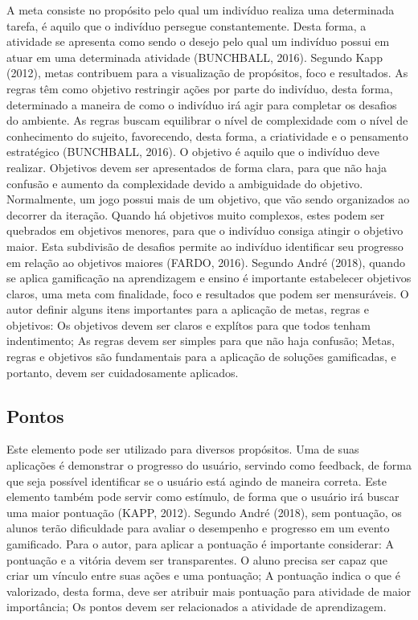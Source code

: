 \documentclass[
	12pt,				%
	oneside,			%
	a4paper,			%
	english,			%
	french,				%
	spanish,			%
	brazil,				%
	]{abntex2}
\begin{document}
A meta consiste no propósito pelo qual um indivíduo realiza uma determinada tarefa, é aquilo que o indivíduo persegue constantemente. Desta forma, a atividade se apresenta como sendo o desejo pelo qual um indivíduo possui em atuar em uma determinada atividade (BUNCHBALL, 2016). Segundo Kapp (2012), metas contribuem para a visualização de propósitos, foco e resultados.
As regras têm como objetivo restringir ações por parte do indivíduo, desta forma, determinado a maneira de como o indivíduo irá agir para completar os desafios do ambiente. As regras buscam equilibrar o nível de complexidade com o nível de conhecimento do sujeito, favorecendo, desta forma, a criatividade e o pensamento estratégico (BUNCHBALL, 2016).
O objetivo é aquilo que o indivíduo deve realizar. Objetivos devem ser apresentados de forma clara, para que não haja confusão e aumento da complexidade devido a ambiguidade do objetivo. Normalmente, um jogo possui mais de um objetivo, que vão sendo organizados ao decorrer da iteração. Quando há objetivos muito complexos, estes podem ser quebrados em objetivos menores, para que o indivíduo consiga atingir o objetivo maior. Esta subdivisão de desafios permite ao indivíduo identificar seu progresso em relação ao objetivos maiores (FARDO, 2016).
	Segundo André (2018), quando se aplica gamificação na aprendizagem e ensino é importante estabelecer objetivos claros, uma meta com finalidade, foco e resultados que podem ser mensuráveis. O autor definir alguns itens importantes para a aplicação de metas, regras e objetivos:
Os objetivos devem ser claros e explítos para que todos tenham indentimento;
As regras devem ser simples para que não haja confusão;
Metas, regras e objetivos são fundamentais para a aplicação de soluções gamificadas, e portanto, devem ser cuidadosamente aplicados.

\subsection{Pontos}

	Este elemento pode ser utilizado para diversos propósitos. Uma de suas aplicações é demonstrar o progresso do usuário, servindo como feedback, de forma que seja possível identificar se o usuário está agindo de maneira correta. Este elemento também pode servir como estímulo, de forma que o usuário irá buscar uma maior pontuação (KAPP, 2012). 
	Segundo André (2018), sem pontuação, os alunos terão dificuldade para avaliar o desempenho e progresso em um evento gamificado. Para o autor, para aplicar a pontuação é importante considerar:
A pontuação e a vitória devem ser transparentes. O aluno precisa ser capaz que criar um vínculo entre suas ações e uma pontuação;
A pontuação indica o que é valorizado, desta forma, deve ser atribuir mais pontuação para atividade de maior importância;
Os pontos devem ser relacionados a atividade de aprendizagem.
\end{document}
